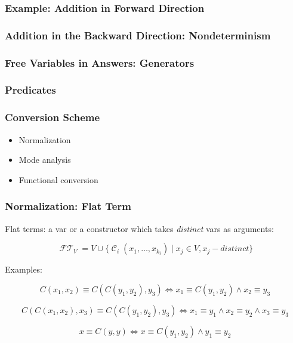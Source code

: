 \documentclass[xcolor=table]{beamer}
\DeclareMathOperator{\FlatTerm}{\mathcal{FT}}
\DeclareMathOperator{\Cons}{\mathcal{C}}
\begin{document}
\lstset{basicstyle=\small}

\begin{frame}[fragile]
  \frametitle{Example: Addition in Forward Direction}



\end{frame}

\begin{frame}[fragile]
  \frametitle{Addition in the Backward Direction: Nondeterminism}



\end{frame}

\begin{frame}[fragile]
  \frametitle{Free Variables in Answers: Generators}



\end{frame}

\begin{frame}[fragile]
  \frametitle{Predicates}
  

  
\end{frame}



\begin{frame}[fragile]
  \frametitle{Conversion Scheme}
  \begin{itemize}
    \item Normalization
    \item Mode analysis
    \item Functional conversion
  \end{itemize}
\end{frame}


\begin{frame}[fragile]
  \frametitle{Normalization: Flat Term}

Flat terms: a var or a constructor which takes \emph{distinct} vars as arguments:

  \[  \FlatTerm_{V} = V \cup \{\Cons_{i}\left( x_1, \ldots, x_{k_{i}} \right) \mid x_{j}\in V, x_j - distinct \} \]

Examples:

\[ C\left( x_1, x_2 \right) \equiv C\left( C\left( y_1, y_2 \right), y_3 \right) \iff x_1 \equiv C\left( y_1, y_2 \right) \land x_2 \equiv y_3   \]

\[ C\left( C\left( x_1, x_2 \right), x_3 \right) \equiv C\left( C\left( y_1, y_2 \right), y_3 \right) \iff x_1 \equiv y_1 \land x_2 \equiv y_2 \land x_3 \equiv y_3   \]

\[x \equiv C\left( y, y \right) \iff x \equiv C\left( y_1, y_2 \right)\land y_1 \equiv y_2 \]
\end{frame}
\end{document}
